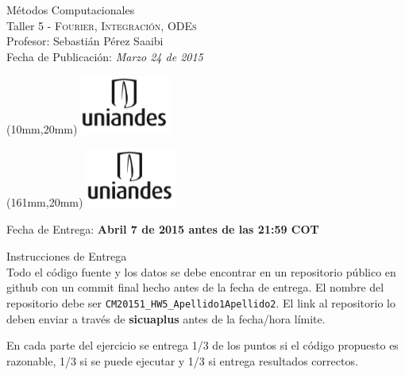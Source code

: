 \documentclass[11pt,letterpaper]{exam}
\begin{document}
\begin{center}
{\Large Métodos Computacionales} \\
Taller 5 - \textsc{Fourier, Integración, ODEs} \\
Profesor: Sebastián Pérez Saaibi\\
Fecha de Publicación: {\small \it Marzo 24 de 2015}\\
\end{center}

\begin{textblock*}{40mm}(10mm,20mm)
  \includegraphics[width=3cm]{logoUniandes.png}
\end{textblock*}

\begin{textblock*}{40mm}(161mm,20mm)
  \includegraphics[width=3cm]{logoUniandes.png}
\end{textblock*}

\vspace{0.5cm}

{\Large Fecha de Entrega:  \bf Abril 7 de 2015 antes de las 21:59 COT}

\vspace{0.5cm}

{\Large Instrucciones de Entrega}\\


Todo el código fuente y los datos se debe encontrar en un repositorio público en github con un commit final hecho antes de la fecha de entrega. El nombre del repositorio debe ser \newline \verb+CM20151_HW5_Apellido1Apellido2+. El link al repositorio lo deben enviar a través de \textbf{sicuaplus} antes de la fecha/hora límite.

En cada parte del ejercicio se entrega 1/3 de los puntos si el código propuesto es razonable, 1/3 si se puede ejecutar y 1/3 si entrega resultados correctos.

\vspace{0.5cm}
\end{document}
